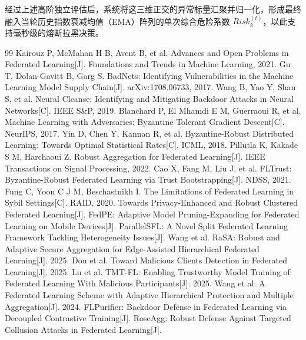 \documentclass[11pt, a4paper, UTF8, fontset=fandol]{ctexart}
\begin{document}
经过上述高阶独立评估后，系统将这三维正交的异常标量汇聚并归一化，形成最终融入当轮历史指数衰减均值（EMA）阵列的单次综合危险系数 $Risk_{k}^{(t)}$，以此支持毫秒级的熔断拉黑决策。

\begin{thebibliography}{99}
     Kairouz P, McMahan H B, Avent B, et al. Advances and Open Problems in Federated Learning[J]. Foundations and Trends in Machine Learning, 2021.
     Gu T, Dolan-Gavitt B, Garg S. BadNets: Identifying Vulnerabilities in the Machine Learning Model Supply Chain[J]. arXiv:1708.06733, 2017.
     Wang B, Yao Y, Shan S, et al. Neural Cleanse: Identifying and Mitigating Backdoor Attacks in Neural Networks[C]. IEEE S\&P, 2019.
     Blanchard P, El Mhamdi E M, Guerraoui R, et al. Machine Learning with Adversaries: Byzantine Tolerant Gradient Descent[C]. NeurIPS, 2017.
     Yin D, Chen Y, Kannan R, et al. Byzantine-Robust Distributed Learning: Towards Optimal Statistical Rates[C]. ICML, 2018.
     Pillutla K, Kakade S M, Harchaoui Z. Robust Aggregation for Federated Learning[J]. IEEE Transactions on Signal Processing, 2022.
     Cao X, Fang M, Liu J, et al. FLTrust: Byzantine-Robust Federated Learning via Trust Bootstrapping[J]. NDSS, 2021.
     Fung C, Yoon C J M, Beschastnikh I. The Limitations of Federated Learning in Sybil Settings[C]. RAID, 2020.
     Towards Privacy-Enhanced and Robust Clustered Federated Learning[J]. 
     FedPE: Adaptive Model Pruning-Expanding for Federated Learning on Mobile Devices[J]. 
 ParallelSFL: A Novel Split Federated Learning Framework Tackling Heterogeneity Issues[J]. 
     Wang et al. RaSA: Robust and Adaptive Secure Aggregation for Edge-Assisted Hierarchical Federated Learning[J]. 2025.
     Dou et al. Toward Malicious Clients Detection in Federated Learning[J]. 2025.
     Lu et al. TMT-FL: Enabling Trustworthy Model Training of Federated Learning With Malicious Participants[J]. 2025.
     Wang et al. A Federated Learning Scheme with Adaptive Hierarchical Protection and Multiple Aggregation[J]. 2024.
     FLPurifier: Backdoor Defense in Federated Learning via Decoupled Contrastive Training[J]. 
     RoseAgg: Robust Defense Against Targeted Collusion Attacks in Federated Learning[J]. 

\end{thebibliography}
\end{document}
